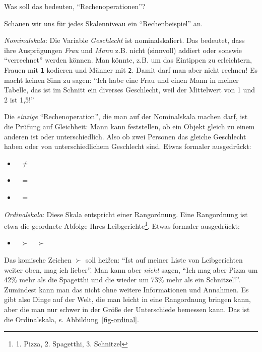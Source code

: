 \documentclass[
  a4paper,
  DIV=11]{scrreprt}
\providecommand{\tightlist}{%
  \setlength{\itemsep}{0pt}\setlength{\parskip}{0pt}}\usepackage{longtable,booktabs,array}
\theoremstyle{definition}
\theoremstyle{definition}
\theoremstyle{remark}
\begin{document}
Was soll das bedeuten, ``Rechenoperationen''?

Schauen wir uns für jedes Skalenniveau ein ``Rechenbeispiel'' an.

\emph{Nominalskala}: Die Variable \emph{Geschlecht} ist nominalskaliert.
Das bedeutet, dass ihre Ausprägungen \emph{Frau} und \emph{Mann} z.B.
nicht (sinnvoll) addiert oder sonswie ``verrechnet'' werden können. Man
könnte, z.B. um das Eintippen zu erleichtern, Frauen mit \texttt{1}
kodieren und Männer mit \texttt{2}. Damit darf man aber nicht rechnen!
Es macht keinen Sinn zu sagen: ``Ich habe eine Frau und einen Mann in
meiner Tabelle, das ist im Schnitt ein diverses Geschlecht, weil der
Mittelwert von 1 und 2 ist 1,5!''

Die \emph{einzige} ``Rechenoperation'', die man auf der Nominalskala
machen darf, ist die Prüfung auf Gleichheit: Mann kann feststellen, ob
ein Objekt gleich zu einem anderen ist oder unterschiedlich. Also ob
zwei Personen das gleiche Geschlecht haben oder von unterschiedlichem
Geschlecht sind. Etwas formaler ausgedrückt:

\begin{itemize}
\tightlist
\item
  👩 \(\ne\) 👨
\item
  👩 \(=\) 👩
\item
  👨 \(=\) 👨
\end{itemize}

\emph{Ordinalskala}: Diese Skala entspricht einer Rangordnung. Eine
Rangordnung ist etwa die geordnete Abfolge Ihres
Leibgerichte\footnote{1. Pizza, 2. Spagetthi, 3. Schnitzel}. Etwas
formaler ausgedrückt:

\begin{itemize}
\tightlist
\item
  🍕 \(\succ\) 🍝 \(\succ\) 🥩
\end{itemize}

Das komische Zeichen \(\succ\) soll heißen: ``Ist auf meiner Liste von
Leibgerichten weiter oben, mag ich lieber''. Man kann aber \emph{nicht}
sagen, ``Ich mag aber Pizza um 42\% mehr als die Spagetthi und die
wieder um 73\% mehr als ein Schnitzel!''. Zumindest kann man das nicht
ohne weitere Informationen und Annahmen. Es gibt also Dinge auf der
Welt, die man leicht in eine Rangordnung bringen kann, aber die man nur
schwer in der Größe der Unterschiede bemessen kann. Das ist die
Ordinalskala, s. Abbildung~\ref{fig-ordinal}.
\end{document}
